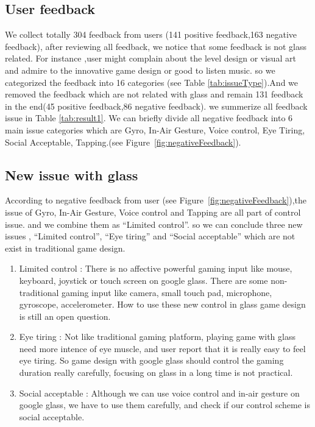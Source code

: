 \subsection{User feedback}
We collect totally 304 feedback from users (141 positive feedback,163 negative feedback), after reviewing all feedback, we notice that some feedback is not glass related. For instance ,user might complain about the level design or visual art and admire to the innovative game design or good to listen music. so we categorized the feedback into 16 categories (see Table \ref{tab:issueType}).And we removed the feedback which are not related with glass and remain 131 feedback in the end(45 positive feedback,86 negative feedback). we summerize all feedback issue in Table \ref{tab:result1}. We can briefly divide all negative feedback into 6 main issue categories which are Gyro, In-Air Gesture, Voice control, Eye Tiring, Social Acceptable, Tapping.(see Figure~\ref{fig:negativeFeedback}).


\subsection{New issue with glass}
According to negative feedback from user (see Figure~\ref{fig:negativeFeedback}),the issue of Gyro, In-Air Gesture, Voice control and Tapping are all part of control issue. and we combine them as ``Limited control''. so we can conclude three new issues , ``Limited control'', ``Eye tiring'' and ``Social acceptable'' which are not exist in traditional game design.

\begin{enumerate}
\item Limited control : There is no affective powerful gaming input like mouse, keyboard, joystick or touch screen on google glass. There are some non-traditional gaming input like camera, small touch pad, microphone, gyroscope, accelerometer. How to use these new control in glass game design is still an open question.

\item Eye tiring : Not like traditional gaming platform, playing game with glass need more intence of eye muscle, and user report that it is really easy to feel eye tiring. So game design with google glass should control the gaming duration really carefully, focusing on glass in a long time is not practical.

\item Social acceptable : Although we can use voice control and in-air gesture on google glass, we have to use them carefully, and check if our control scheme is social acceptable.

\end{enumerate}


